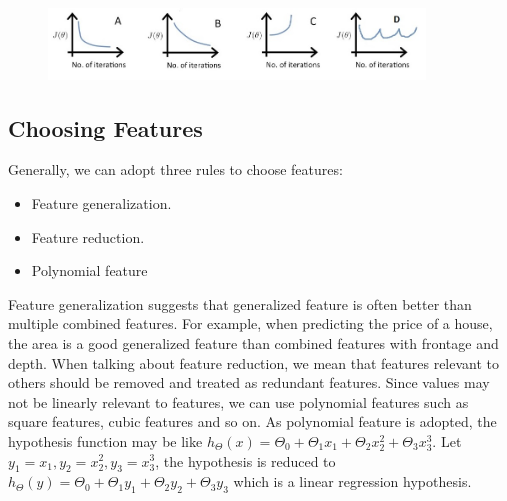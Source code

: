 \documentclass{article}
\begin{document}
\begin{figure}[ht]
  \centering
  \includegraphics[width=10cm]{Figure1.jpg}\\
  \caption{}\label{learning_rate_choice}
\end{figure}

\subsection{Choosing Features}
Generally, we can adopt three rules to choose features:
\begin{itemize}
\item Feature generalization.
\item Feature reduction.
\item Polynomial feature
\end{itemize}
Feature generalization suggests that generalized feature is often better than multiple combined features. For example, when predicting the price of a house, the area is a good generalized feature than combined features with frontage and depth. When talking about feature reduction, we mean that features relevant to others should be removed and treated as redundant features. Since values may not be linearly relevant to features, we can use polynomial features such as square features, cubic features and so on. As polynomial feature is adopted, the hypothesis function may be like $h_{\Theta}(x) = \Theta_{0} + \Theta_{1}x_{1} + \Theta_{2}x_{2}^{2} + \Theta_{3}x_{3}^{3}$. Let $y_{1} = x_{1}, y_{2} = x_{2}^{2}, y_{3} = x_{3} ^ {3}$, the hypothesis is reduced to $h_{\Theta}(y) = \Theta_{0} + \Theta_{1}y_{1} + \Theta_{2}y_{2} + \Theta_{3}y_{3}$ which is a linear regression hypothesis.
\end{document}
